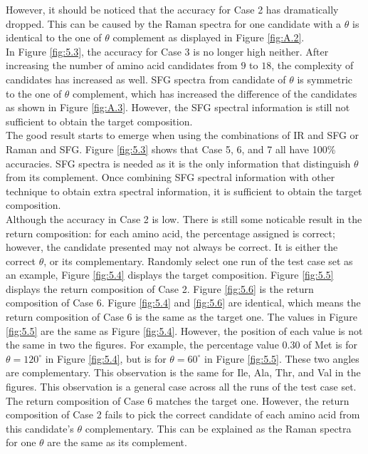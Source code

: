 However, it should be noticed that the accuracy for Case 2 has dramatically dropped. This can be caused by the Raman spectra for one candidate with a $\theta$ is identical to the one of $\theta$ complement as displayed in Figure \ref{fig:A.2}. \\

In Figure \ref{fig:5.3}, the accuracy for Case 3 is no longer high neither. After increasing the number of amino acid candidates from $9$ to $18$, the complexity of candidates has increased as well. SFG spectra from candidate of $\theta$ is symmetric to the one of $\theta$ complement, which has increased the difference of the candidates as shown in Figure \ref{fig:A.3}. However, the SFG spectral information is still not sufficient to obtain the target composition. \\

The good result starts to emerge when using the combinations of IR and SFG or Raman and SFG. Figure \ref{fig:5.3} shows that Case 5, 6, and 7 all have 100\% accuracies. SFG spectra is needed as it is the only information that distinguish $\theta$ from its complement. Once combining SFG spectral information with other technique to obtain extra spectral information, it is sufficient to obtain the target composition. \\

Although the accuracy in Case 2 is low. There is still some noticable result in the return composition: for each amino acid, the percentage assigned is correct; however, the candidate presented may not always be correct. It is either the correct $\theta$, or its complementary. Randomly select one run of the test case set as an example, Figure \ref{fig:5.4} displays the target composition. Figure \ref{fig:5.5} displays the return composition of Case 2. Figure \ref{fig:5.6} is the return composition of Case 6. Figure \ref{fig:5.4} and \ref{fig:5.6} are identical, which means the return composition of Case 6 is the same as the target one. The values in Figure \ref{fig:5.5} are the same as Figure \ref{fig:5.4}. However, the position of each value is not the same in two the figures. For example, the percentage value $0.30$ of Met is for $\theta = 120^{\circ}$ in Figure \ref{fig:5.4}, but is for $\theta = 60^{\circ}$ in Figure \ref{fig:5.5}. These two angles are complementary. This observation is the same for Ile, Ala, Thr, and Val in the figures. This observation is a general case across all the runs of the test case set. The return composition of Case 6 matches the target one. However, the return composition of Case 2 fails to pick the correct candidate of each amino acid from this candidate's $\theta$ complementary. This can be explained as the Raman spectra for one $\theta$ are the same as its complement. \\

